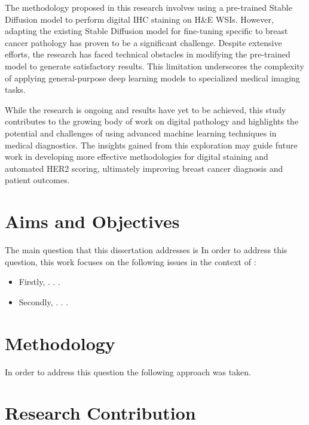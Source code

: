 The methodology proposed in this research involves using a pre-trained Stable Diffusion model to perform digital IHC staining on H&E WSIs. However, adapting the existing Stable Diffusion model for fine-tuning specific to breast cancer pathology has proven to be a significant challenge. Despite extensive efforts, the research has faced technical obstacles in modifying the pre-trained model to generate satisfactory results. This limitation underscores the complexity of applying general-purpose deep learning models to specialized medical imaging tasks.

While the research is ongoing and results have yet to be achieved, this study contributes to the growing body of work on digital pathology and highlights the potential and challenges of using advanced machine learning techniques in medical diagnostics. The insights gained from this exploration may guide future work in developing more effective methodologies for digital staining and automated HER2 scoring, ultimately improving breast cancer diagnosis and patient outcomes.




\section{Aims and Objectives} 

The main question that this dissertation addresses is  
In order to address this question, this work focuses on the following issues in the context of :

\begin{itemize}

\item Firstly, . . .

\item Secondly, . . . 

\end{itemize}



\section{Methodology} 

In order to address this question the following approach was taken. 
 
 
\section{Research Contribution}

